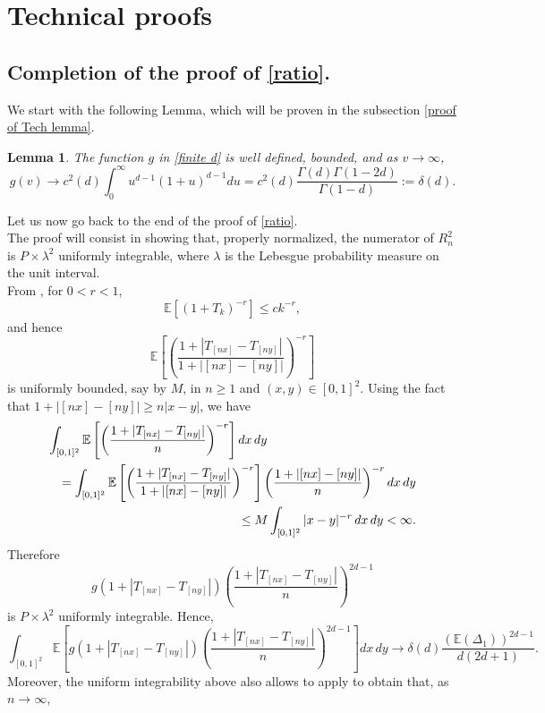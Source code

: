 \documentclass[preprint,12pt]{article}
\newtheorem{lem}{Lemma}
\begin{document}
\section{Technical proofs}\label{parts}
\subsection{Completion of the proof of \eqref{ratio}.}\label{technical}
We start with the following Lemma, which will be proven in the subsection \ref{proof of Tech lemma}.
\begin{lem}\label{function g}
The function $g$ in \eqref{finite d} is well defined, bounded, and as $v\to\infty$, 
\begin{equation}\label{delta d}
g(v)\to c^2(d)\int_0^\infty u^{d-1}(1+u)^{d-1}du=c^2(d)\frac{\Gamma(d)\Gamma(1-2d)}{\Gamma(1-d)}:=\delta(d).
\end{equation}
\end{lem}
Let us now go back to the end of the proof of \eqref{ratio}. \\
 The  proof will consist in showing that, properly normalized, the numerator of $R_n^2$ is $P\times\lambda^2$ uniformly integrable, where $\lambda$ is the Lebesgue probability measure on the unit interval.  \\
From \cite{SHI20101260}, for $0<r<1$,
$$
\mathbb{E}\left[(1+T_k)^{-r}\right]
\le
ck^{-r},
$$
and hence
$$
\mathbb{E}
\left[
\left(
\frac{1+|T_{[nx]}-T_{[ny]}|}
{1+|[nx]-[ny]|}
\right)^{-r}
\right]
$$
is uniformly bounded, say by $M$, in $n\ge1$ and $(x,y)\in[0,1]^2$. Using the fact that $1+|[nx]-[ny]|\ge n|x-y|$, we have
\begin{eqnarray*}
\lefteqn{
\int_{[0,1]^2}
\mathbb{E}
\left[
\left(
\frac{1+|T_{[nx]}-T_{[ny]}|}
{n}
\right)^{-r}
\right]dx\,dy
}\\
&&=
\int_{[0,1]^2}
\mathbb{E}
\left[
\left(
\frac{1+|T_{[nx]}-T_{[ny]}|}
{1+|[nx]-[ny]|}
\right)^{-r}
\right]
\left(
\frac{1+|[nx]-[ny]|}{n}
\right)^{-r}
dx\,dy\\
&&\le
M
\int_{[0,1]^2}
|x-y|^{-r}\,dx\,dy
<
\infty.
\end{eqnarray*}
Therefore
$$
g(1+|T_{[nx]}-T_{[ny]}|)\left(
\frac{1+|T_{[nx]}-T_{[ny]}|}
{n}
\right)^{2d-1}
$$
is $P\times\lambda^2$ uniformly integrable. Hence, 
$$
\int_{[0,1]^2}
\mathbb{E}
\left[
g(1+|T_{[nx]}-T_{[ny]}|)\left(
\frac{1+|T_{[nx]}-T_{[ny]}|}
{n}
\right)^{2d-1}
\right]
dx\,dy
\to
\delta(d)\frac{\left(\mathbb{E}(\Delta_1)\right)^{2d-1}}
{d(2d+1)}.
$$
Moreover, the uniform integrability above also allows to apply  \cite{CREMERS1986305} to obtain that,  as $n\to\infty$,
\end{document}
